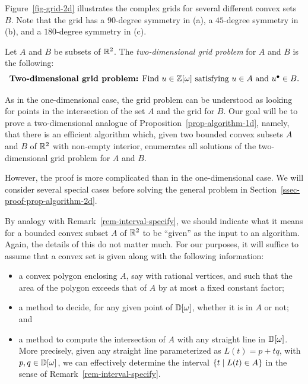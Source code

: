 \documentclass{article}
\begin{document}
\begin{example}
  Figure~\ref{fig-grid-2d} illustrates the complex grids for several
  different convex sets $B$. Note that the grid has a $90$-degree
  symmetry in (a), a $45$-degree symmetry in (b), and a $180$-degree
  symmetry in (c).
\end{example}

\begin{definition}
  Let $A$ and $B$ be subsets of ${\mathbb{R}}^2$. The {\em two-dimensional grid
    problem} for $A$ and $B$ is the following:
  \begin{equation}\label{eqn-grid-constraint-2d}
    \mbox{{\bf Two-dimensional grid problem:} Find
      $u\in\mathbb{Z}[\omega]$ satisfying $u \in A$ and $u^{\bullet}\in B$.}
  \end{equation}
\end{definition}

As in the one-dimensional case, the grid problem can be understood as
looking for points in the intersection of the set $A$ and the grid
for $B$.  Our goal will be to prove a two-dimensional analogue of
Proposition~\ref{prop-algorithm-1d}, namely, that there is an
efficient algorithm which, given two bounded convex subsets $A$ and
$B$ of ${\mathbb{R}}^2$ with non-empty interior, enumerates all solutions of the
two-dimensional grid problem for $A$ and $B$.

However, the proof is more complicated than in the one-dimensional
case. We will consider several special cases before solving the
general problem in Section~\ref{ssec-proof-prop-algorithm-2d}.

\begin{remark}\label{rem-convex-specify}
  By analogy with Remark~\ref{rem-interval-specify}, we should
  indicate what it means for a bounded convex subset $A$ of ${\mathbb{R}}^2$ to
  be ``given'' as the input to an algorithm. Again, the details of
  this do not matter much. For our purposes, it will suffice to assume
  that a convex set is given along with the following information:
  \begin{itemize}
  \item a convex polygon enclosing $A$, say with rational vertices,
    and such that the area of the polygon exceeds that of $A$ by at
    most a fixed constant factor;
  \item a method to decide, for any given point of ${\mathbb{D}}[\omega]$,
    whether it is in $A$ or not; and
  \item a method to compute the intersection of $A$ with any straight
    line in ${\mathbb{D}}[\omega]$. More precisely, given any straight line
    parameterized as $L(t)=p+tq$, with $p,q\in{\mathbb{D}}[\omega]$, we can
    effectively determine the interval $\{t\mid L(t)\in A\}$ in the
    sense of Remark~\ref{rem-interval-specify}.
  \end{itemize}
\end{remark}
\end{document}
